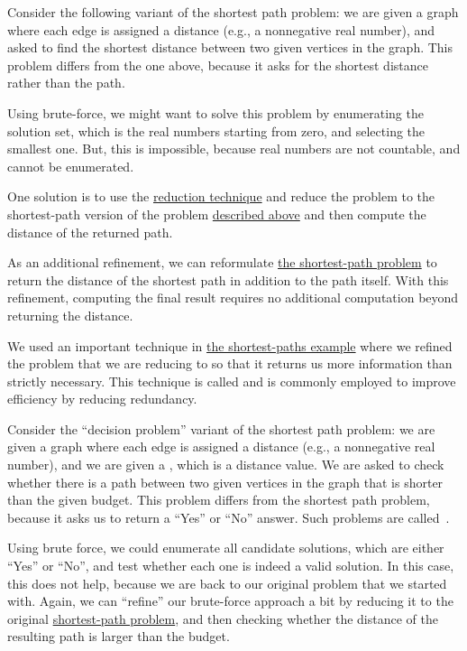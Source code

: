 \begin{example}
\label{ex:design::bf::shortest-distances}
Consider the following variant of the shortest path problem: we are
given a graph where each edge is assigned a distance
%
(e.g., a nonnegative real number), 
%
and asked to find the shortest distance between two given vertices in
the graph.  This problem differs from the one above, because it asks
for the shortest distance rather than the path.
%

Using brute-force, we might want to solve this problem by enumerating
the solution set, which is the real numbers starting from zero, and
selecting the smallest one.
%
But, this is impossible, because real numbers are not countable, and
cannot be enumerated.
%

One solution is to use the \href{sec:design::reduction}{reduction technique}
and reduce the problem to the shortest-path version of the problem \href{ex:design::bf::shortest-paths}{described above} and then compute the distance of the returned path.
%

As an additional refinement, we can reformulate \href{ex:design::bf::shortest-paths}{the shortest-path problem} to return the distance of the shortest path in addition to the path itself.  
%
With this refinement, computing the final result requires no
additional computation beyond returning the distance.
%
\end{example}


\begin{important}[Strengthening]
We used an important technique in
\href{ex:design::bf::shortest-distances}{the shortest-paths example} where we refined the problem that we are reducing to so that it returns us more information than strictly necessary.  
%
This technique is called  and is commonly employed
to improve efficiency by reducing redundancy.
\end{important}

\begin{example}
\label{ex:design::bf::shortest-paths-decision}
Consider the ``decision problem'' variant of the shortest path
problem: we are given a graph where each edge is assigned a distance
(e.g., a nonnegative real number), and we are given a ,
which is a distance value.
%
We are asked to check whether there is a path between two given
vertices in the graph that is shorter than the given budget.  
%
This problem differs from the shortest path problem, because it asks
us to return a ``Yes'' or ``No'' answer. Such problems are
called~.

Using brute force, we could enumerate all candidate
solutions, which are either ``Yes'' or ``No'', and test whether each
one is indeed a valid solution.
%
In this case, this does not help, because we are back to our original
problem that we started with.
%
Again, we can ``refine'' our brute-force approach a bit by reducing it
to the original \href{ex:design::bf::shortest-paths}{shortest-path problem}, and then checking whether the distance of the resulting path is larger than the budget.
%
\end{example}

